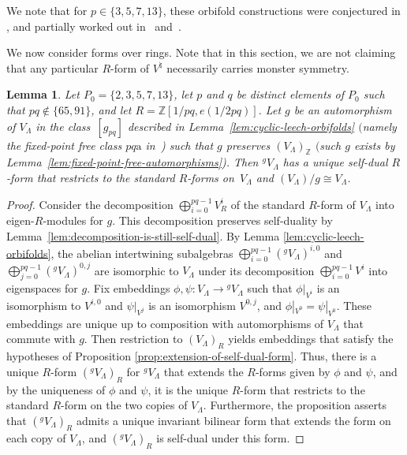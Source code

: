 \documentclass[pdftex]{sigma}
\newcommand{\bZ}{\mathbb{Z}}
\newtheorem{lem}[thm]{Lemma}
\theoremstyle{definition}
\begin{document}
We note that for $p \in \{3,5,7,13\}$, these orbifold constructions were conjectured in \cite{FLM88}, and partially worked out in~\cite{DM94b} and~\cite{M95}.

We now consider forms over rings. Note that in this section, we are not claiming that any particular $R$-form of $V^\natural$ necessarily carries monster symmetry.

\begin{lem} \label{lem:R-form-for-ALY-algebra}Let $P_0 = \{ 2,3,5,7,13\}$, let $p$ and $q$ be distinct elements of $P_0$ such that $pq \not\in \{65, 91\}$, and let $R = \bZ[1/pq, e(1/2pq)]$. Let $g$ be an automorphism of $V_\Lambda$ in the class~$[g_{pq}]$ described in Lemma~{\rm \ref{lem:cyclic-leech-orbifolds}} $($namely the fixed-point free class $pq\mathrm{a}$ in~{\rm \cite{GAP})} such that $g$ preserves $(V_\Lambda)_\bZ$ $($such $g$ exists by Lemma~{\rm \ref{lem:fixed-point-free-automorphisms})}. Then ${}^gV_\Lambda$ has a unique self-dual $R$-form that restricts to the standard $R$-forms on~$V_\Lambda$ and $(V_\Lambda)/g \cong V_\Lambda$.
\end{lem}
\begin{proof}Consider the decomposition $\bigoplus_{i=0}^{pq-1} V^i_R$ of the standard $R$-form of $V_\Lambda$ into eigen-$R$-modules for $g$. This decomposition preserves self-duality by Lemma~\ref{lem:decomposition-is-still-self-dual}. By Lemma \ref{lem:cyclic-leech-orbifolds}, the abelian intertwining subalgebras $\bigoplus_{i=0}^{pq-1} ({}^gV_\Lambda)^{i,0}$ and $\bigoplus_{j=0}^{pq-1} ({}^gV_\Lambda)^{0,j}$ are isomorphic to $V_\Lambda$ under its decomposition $\bigoplus_{i=0}^{pq-1} V^i$ into eigenspaces for $g$. Fix embeddings $\phi, \psi\colon V_\Lambda \to {}^gV_\Lambda$ such that $\phi|_{V^i}$ is an isomorphism to $V^{i,0}$ and $\psi|_{V^j}$ is an isomorphism $V^{0,j}$, and $\phi|_{V^0} = \psi|_{V^0}$. These embeddings are unique up to composition with automorphisms of $V_\Lambda$ that commute with $g$. Then restriction to $(V_\Lambda)_R$ yields embeddings that satisfy the hypotheses of Proposition \ref{prop:extension-of-self-dual-form}. Thus, there is a unique $R$-form $({}^gV_\Lambda)_R$ for ${}^gV_\Lambda$ that extends the $R$-forms given by $\phi$ and $\psi$, and by the uniqueness of $\phi$ and $\psi$, it is the unique $R$-form that restricts to the standard $R$-form on the two copies of $V_\Lambda$. Furthermore, the proposition asserts that $({}^gV_\Lambda)_R$ admits a unique invariant bilinear form that extends the form on each copy of $V_\Lambda$, and $({}^gV_\Lambda)_R$ is self-dual under this form.
\end{proof}
\end{document}
